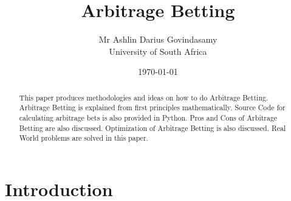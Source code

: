 \documentclass{report}
\title{Arbitrage Betting}
\author{Mr Ashlin Darius Govindasamy\\ \large{University of South Africa}}
\date{\today}
\begin{document}
\maketitle
\newpage
\begin{abstract}
    This paper produces methodologies and ideas on how to do Arbitrage Betting. Arbitrage Betting is explained from first principles mathematically. Source Code for calculating arbitrage bets is also provided in Python. Pros and Cons of Arbitrage Betting are also discussed. Optimization of Arbitrage Betting is also discussed. Real World problems are solved in this paper.
\end{abstract}

\tableofcontents



\chapter{Introduction}


\newpage
\end{document}
